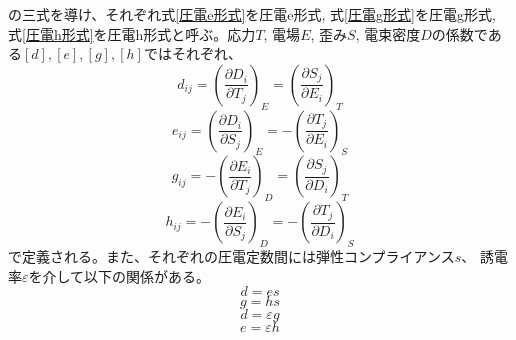 \documentclass[dvipdfmx,12pt,a4paper]{jreport}
\begin{document}
			の三式を導け、それぞれ式\ref{圧電e形式}を圧電e形式, 
			式\ref{圧電g形式}を圧電g形式, 式\ref{圧電h形式}を圧電h形式と呼ぶ。応力$T$, 電場$E$, 歪み$S$, 電束密度$D$の係数である$[d],[e],[g],[h]$ではそれぞれ、
			\begin{equation}
				d_{ij}=\left(\frac{\partial D_i}{\partial T_j}\right)_E=\left(\frac{\partial S_j}{\partial E_i}\right)_T
			\end{equation}
			\begin{equation}
				e_{ij}=\left(\frac{\partial D_i}{\partial S_j}\right)_E=-\left(\frac{\partial T_j}{\partial E_i}\right)_S
			\end{equation} 
			\begin{equation}
				g_{ij}=-\left(\frac{\partial E_i}{\partial T_j}\right)_D=\left(\frac{\partial S_j}{\partial D_i}\right)_T
			\end{equation}
			\begin{equation}
				h_{ij}=-\left(\frac{\partial E_i}{\partial S_j}\right)_D=-\left(\frac{\partial T_j}{\partial D_i}\right)_S
			\end{equation}
			で定義される。また、それぞれの圧電定数間には弾性コンプライアンス$s$、
			誘電率$\varepsilon$を介して以下の関係がある。
			\begin{equation}
				d = e s
			\end{equation}
			\begin{equation}
				g = h s
			\end{equation}
			\begin{equation}
				d = \varepsilon g
			\end{equation}
			\begin{equation}
				e = \varepsilon h
			\end{equation}
\end{document}

